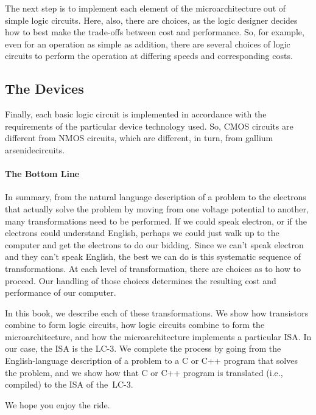 \documentclass{patt}
\begin{document}
The next step is to implement each element of the microarchitecture out of simple
logic circuits.  Here, also, there are choices, as the logic designer decides how
to best make the trade-offs between cost and performance.  So, for example, 
even for an operation as simple as addition, there are several choices of logic circuits to perform
the operation at differing speeds and corresponding costs.

\subsection{The Devices}

Finally, each basic logic circuit is implemented in accordance with the requirements
of the particular device technology used.  So, CMOS circuits are different from
NMOS circuits, which are different, in turn, from gallium arsenide\break circuits.

\paragraph{The Bottom Line}

In summary, from the natural language description of a problem to the electrons 
that actually solve the problem by moving from one voltage potential to 
another, many transformations need to be performed.  If we could speak 
electron, or if the electrons could understand English, perhaps we could just 
walk up to the computer and get the electrons to do our bidding.  Since we 
can't speak electron and they can't speak English, the best we can do is this
systematic sequence of transformations.  At each level of transformation, 
there are choices as to how to proceed.  Our handling of those choices 
determines the resulting cost and performance of our computer.

In this book, we describe each of these transformations.  We show how
transistors combine to form logic circuits, how logic circuits combine to form
the microarchitecture, and how the microarchitecture implements 
a particular ISA.  In our case, the ISA is the LC-3.  We complete the process 
by going from the
English-language description of a problem to a C or C++ program that solves 
the problem, and we show how that C or C++ program is translated 
(i.e., compiled) to the ISA of the~LC-3.

We hope you enjoy the ride.
\end{document}

